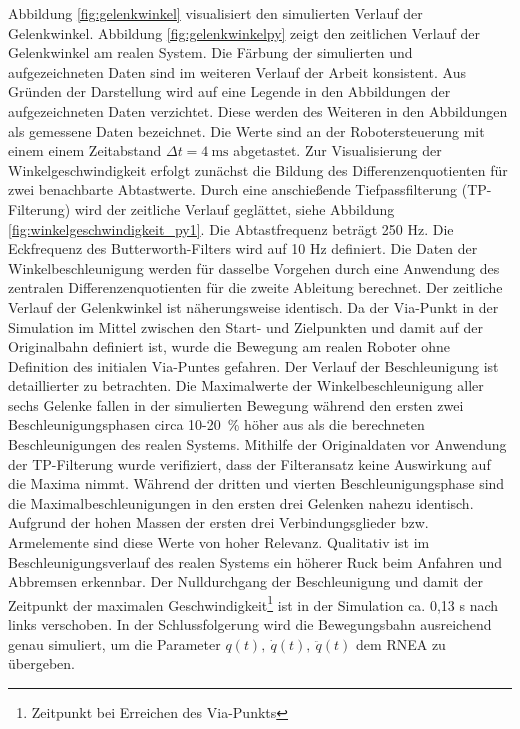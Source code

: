 Abbildung \ref{fig:gelenkwinkel}  visualisiert den simulierten  Verlauf der Gelenkwinkel. Abbildung \ref{fig:gelenkwinkelpy} zeigt den zeitlichen Verlauf der Gelenkwinkel am realen System. Die Färbung der simulierten und aufgezeichneten Daten sind im weiteren Verlauf der Arbeit konsistent. Aus Gründen der Darstellung wird auf eine Legende in den Abbildungen der aufgezeichneten Daten verzichtet. Diese werden des Weiteren in den Abbildungen als gemessene Daten bezeichnet. Die Werte sind an der Robotersteuerung mit einem einem  Zeitabstand $\Delta t = 4~\text{ms}$ abgetastet. Zur Visualisierung der Winkelgeschwindigkeit  erfolgt zunächst die Bildung des Differenzenquotienten für zwei benachbarte Abtastwerte. Durch eine anschießende Tiefpassfilterung (TP-Filterung) wird der zeitliche Verlauf geglättet, siehe Abbildung \ref{fig:winkelgeschwindigkeit_py1}. Die Abtastfrequenz beträgt 250 Hz. Die Eckfrequenz des Butterworth-Filters wird auf 10 Hz definiert. Die Daten der Winkelbeschleunigung werden für dasselbe Vorgehen durch eine Anwendung des zentralen Differenzenquotienten für die zweite Ableitung berechnet. Der zeitliche Verlauf der Gelenkwinkel ist näherungsweise identisch. Da der Via-Punkt in der Simulation im Mittel zwischen den Start- und Zielpunkten und damit auf der Originalbahn definiert ist, wurde die Bewegung am realen Roboter ohne Definition des initialen Via-Puntes gefahren. Der Verlauf der Beschleunigung ist detaillierter zu betrachten. Die Maximalwerte der Winkelbeschleunigung aller sechs Gelenke fallen in der simulierten Bewegung während den ersten zwei Beschleunigungsphasen circa 10-20~\% höher aus als die berechneten Beschleunigungen des realen Systems. Mithilfe der Originaldaten vor Anwendung der TP-Filterung wurde verifiziert, dass der Filteransatz keine Auswirkung auf die Maxima nimmt. Während der dritten und vierten Beschleunigungsphase sind die Maximalbeschleunigungen in den ersten drei Gelenken nahezu identisch. Aufgrund der hohen  Massen der ersten drei Verbindungsglieder bzw. Armelemente sind diese Werte von hoher Relevanz. Qualitativ ist im Beschleunigungsverlauf des realen Systems ein höherer Ruck beim Anfahren und Abbremsen erkennbar. Der Nulldurchgang der Beschleunigung und damit der Zeitpunkt der maximalen Geschwindigkeit\footnote{Zeitpunkt bei Erreichen des Via-Punkts} ist in der Simulation ca. 0,13 s nach links verschoben. In der Schlussfolgerung wird die Bewegungsbahn ausreichend genau simuliert, um die Parameter  $q(t), ~\dot{q}(t), ~\ddot{q}(t)$ dem RNEA zu übergeben. 


